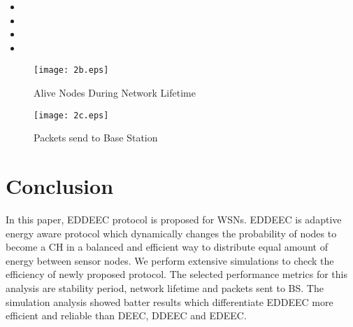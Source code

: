 \documentclass[3p,times,procedia]{elsarticle}
\begin{document}
\begin{itemize}
\item
\item
\item
\item
\end{itemize}


\begin{figure}[!h]
\centering
\texttt{[image: 2b.eps]}
\caption{Alive Nodes During Network Lifetime}
\end{figure}

\begin{figure}[!h]
\centering
\texttt{[image: 2c.eps]}
\caption{Packets send to Base Station}
\end{figure}

\section{Conclusion}
In this paper, EDDEEC protocol is proposed for WSNs. EDDEEC is adaptive energy aware protocol which dynamically changes the probability of nodes to become a CH in a balanced and efficient way to distribute equal amount of energy between sensor nodes. We perform extensive simulations to check the efficiency of newly proposed protocol. The selected performance metrics for this analysis are stability period, network lifetime and packets sent to BS. The simulation analysis showed batter results which differentiate EDDEEC more efficient and reliable than DEEC, DDEEC and EDEEC.
\end{document}
